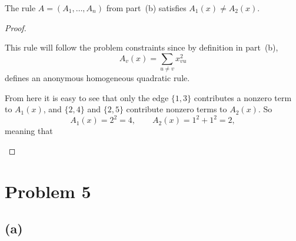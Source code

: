 \documentclass[11pt]{scrartcl}
\begin{document}
\begin{soln}
    \subsubsection*{}

    \begin{claim*}
        The rule $A=(A_1,\ldots,A_n)$ from part~(b) satisfies
        $A_1(x)\ne A_2(x)$.
    \end{claim*}

    \begin{proof}
        \begin{subproof}
			This rule will follow the problem constraints since
            by definition in part~(b),
            \[
            A_v(x)=\sum_{u\ne v}x_{vu}^{2}
            \]
            defines an anonymous homogeneous quadratic rule.
        \end{subproof}

        \begin{subproof}
            From here it is easy to see
			that only the edge $\{1,3\}$ contributes a nonzero term to
            $A_1(x)$, and $\{2,4\}$ and $\{2,5\}$ contribute
            nonzero terms to $A_2(x)$.
            So
            \[
            A_1(x)=2^2=4,\qquad
            A_2(x)=1^2+1^2=2,
            \]
            meaning that 
        \end{subproof}
    \end{proof}
\end{soln}
\newpage

\section{Problem 5}
\subsection{(a)}
\end{document}
